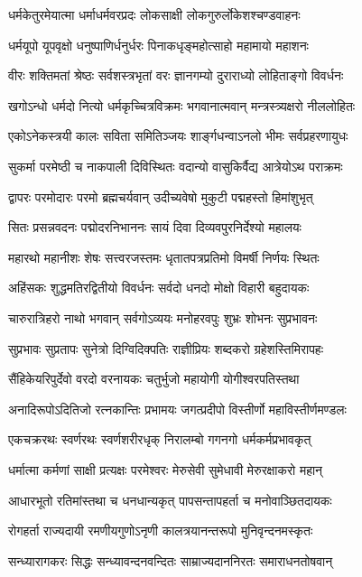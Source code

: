 \twolineshloka
{धर्मकेतुरमेयात्मा धर्माधर्मवरप्रदः}
{लोकसाक्षी लोकगुरुर्लोकेशश्चण्डवाहनः}%

\twolineshloka
{धर्मयूपो यूपवृक्षो धनुष्पाणिर्धनुर्धरः}
{पिनाकधृङ्महोत्साहो महामायो महाशनः}%

\twolineshloka
{वीरः शक्तिमतां श्रेष्ठः सर्वशस्त्रभृतां वरः}
{ज्ञानगम्यो दुराराध्यो लोहिताङ्गो विवर्धनः}%

\twolineshloka
{खगोऽन्धो धर्मदो नित्यो धर्मकृच्चित्रविक्रमः}
{भगवानात्मवान् मन्त्रस्त्र्यक्षरो नीललोहितः}%

\twolineshloka
{एकोऽनेकस्त्रयी कालः सविता समितिञ्जयः}
{शार्ङ्गधन्वाऽनलो भीमः सर्वप्रहरणायुधः}%

\twolineshloka
{सुकर्मा परमेष्ठी च नाकपाली दिविस्थितः}
{वदान्यो वासुकिर्वैद्य आत्रेयोऽथ पराक्रमः}%

\twolineshloka
{द्वापरः परमोदारः परमो ब्रह्मचर्यवान्}
{उदीच्यवेषो मुकुटी पद्महस्तो हिमांशुभृत्}%

\twolineshloka
{सितः प्रसन्नवदनः पद्मोदरनिभाननः}
{सायं दिवा दिव्यवपुरनिर्देश्यो महालयः}%

\twolineshloka
{महारथो महानीशः शेषः सत्त्वरजस्तमः}
{धृतातपत्रप्रतिमो विमर्षी निर्णयः स्थितः}%

\twolineshloka
{अहिंसकः शुद्धमतिरद्वितीयो विवर्धनः}
{सर्वदो धनदो मोक्षो विहारी बहुदायकः}%

\twolineshloka
{चारुरात्रिहरो नाथो भगवान् सर्वगोऽव्ययः}
{मनोहरवपुः शुभ्रः शोभनः सुप्रभावनः}%

\twolineshloka
{सुप्रभावः सुप्रतापः सुनेत्रो दिग्विदिक्पतिः}
{राज्ञीप्रियः शब्दकरो ग्रहेशस्तिमिरापहः}%

\twolineshloka
{सैंहिकेयरिपुर्देवो वरदो वरनायकः}
{चतुर्भुजो महायोगी योगीश्वरपतिस्तथा}%

\twolineshloka
{अनादिरूपोऽदितिजो रत्नकान्तिः प्रभामयः}
{जगत्प्रदीपो विस्तीर्णो महाविस्तीर्णमण्डलः}%

\twolineshloka
{एकचक्ररथः स्वर्णरथः स्वर्णशरीरधृक्}
{निरालम्बो गगनगो धर्मकर्मप्रभावकृत्}%

\twolineshloka
{धर्मात्मा कर्मणां  साक्षी प्रत्यक्षः परमेश्वरः}
{मेरुसेवी सुमेधावी मेरुरक्षाकरो महान्}%

\twolineshloka
{आधारभूतो रतिमांस्तथा च धनधान्यकृत्}
{पापसन्तापहर्ता च मनोवाञ्छितदायकः}%

\twolineshloka
{रोगहर्ता राज्यदायी रमणीयगुणोऽनृणी}
{कालत्रयानन्तरूपो मुनिवृन्दनमस्कृतः}%

\twolineshloka
{सन्ध्यारागकरः सिद्धः सन्ध्यावन्दनवन्दितः}
{साम्राज्यदाननिरतः समाराधनतोषवान्}%

